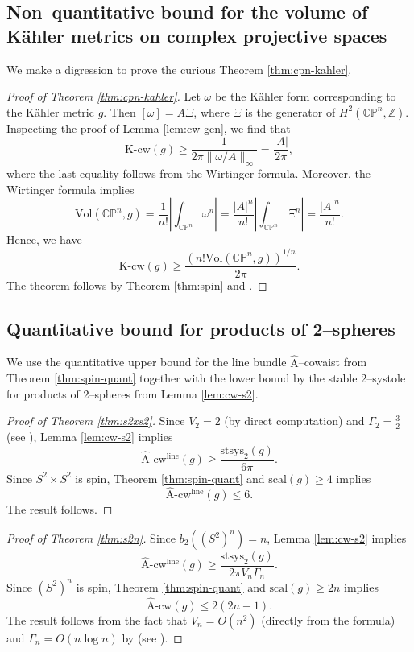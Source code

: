 \documentclass[12pt]{amsart}
\theoremstyle{definition}
\numberwithin{equation}{section}
\newcommand{\Z}{\mathbb{Z}}
\newcommand{\CP}{\mathbb{C}\mathbb{P}}
\newcommand{\kcw}{\mathrm{K}\text{-}\mathrm{cw}}
\newcommand{\acw}{\hat{\mathrm{A}}\text{-}\mathrm{cw}}
\newcommand{\ahat}{\hat{\mathrm{A}}}
\begin{document}
\subsection{Non--quantitative bound for the volume of K{\"a}hler metrics on complex projective spaces}
We make a digression to prove the curious Theorem \ref{thm:cpn-kahler}.

\begin{proof}[Proof of Theorem \ref{thm:cpn-kahler}]
Let $\omega$ be the K{\"a}hler form corresponding to the K{\"a}hler metric $g$. Then $[\omega] = A\Xi$, where $\Xi$ is the generator of $H^2(\CP^n, \Z)$. Inspecting the proof of Lemma \ref{lem:cw-gen}, we find that
\[ \kcw(g) \geq \frac{1}{2\pi\|\omega/A\|_{\infty}} = \frac{|A|}{2\pi}, \]
where the last equality follows from the Wirtinger formula. Moreover, the Wirtinger formula implies
\[ \mathrm{Vol}(\CP^n, g) = \frac{1}{n!}\left|\int_{\CP^n} \omega^n\right| = \frac{|A|^n}{n!}\left|\int_{\CP^n} \Xi^n\right|= \frac{|A|^n}{n!}. \]
Hence, we have
\[ \kcw(g) \geq \frac{(n!\mathrm{Vol}(\CP^n, g))^{1/n}}{2\pi}. \]
The theorem follows by Theorem \ref{thm:spin} and \cite[Chapter II, Example 2.4]{Lawson-Michelson:spin}.
\end{proof}



\subsection{Quantitative bound for products of 2--spheres}
We use the quantitative upper bound for the line bundle $\ahat$--cowaist from Theorem \ref{thm:spin-quant} together with the lower bound by the stable 2--systole for products of 2--spheres from Lemma \ref{lem:cw-s2}.

\begin{proof}[Proof of Theorem \ref{thm:s2xs2}]
Since $V_2 = 2$ (by direct computation) and $\Gamma_2 = \frac{3}{2}$ (see \cite[Proposition 2.3]{GHK:systole}), Lemma \ref{lem:cw-s2} implies
\[ \acw^{\mathrm{line}}(g) \geq \frac{\mathrm{stsys}_2(g)}{6\pi}. \]
Since $S^2 \times S^2$ is spin, Theorem \ref{thm:spin-quant} and $\mathrm{scal}(g) \geq 4$ implies
\[ \acw^{\mathrm{line}}(g) \leq 6. \]
The result follows.
\end{proof}

\begin{proof}[Proof of Theorem \ref{thm:s2n}]
Since $b_2((S^2)^n) = n$, Lemma \ref{lem:cw-s2} implies
\[ \acw^{\mathrm{line}}(g) \geq \frac{\mathrm{stsys}_2(g)}{2\pi V_n \Gamma_n}. \]
Since $(S^2)^n$ is spin, Theorem \ref{thm:spin-quant} and $\mathrm{scal}(g) \geq 2n$ implies
\[ \acw(g) \leq 2(2n-1). \]
The result follows from the fact that $V_n = O(n^2)$ (directly from the formula) and $\Gamma_n = O(n\log n)$ by \cite{Banaszczyk:gamma} (see \cite[\S2]{GHK:systole}).
\end{proof}
\end{document}
